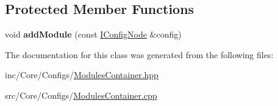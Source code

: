 \subsection*{Protected Member Functions}
\begin{DoxyCompactItemize}
\item 
\mbox{\label{classcore_1_1config_1_1ModulesContainer_ab6ada155227703fdd81f22c2047ffdc2}} 
void {\bfseries add\+Module} (const \hyperlink{classIConfigNode}{I\+Config\+Node} \&config)
\end{DoxyCompactItemize}


The documentation for this class was generated from the following files\+:\begin{DoxyCompactItemize}
\item 
inc/\+Core/\+Configs/\hyperlink{ModulesContainer_8hpp}{Modules\+Container.\+hpp}\item 
src/\+Core/\+Configs/\hyperlink{ModulesContainer_8cpp}{Modules\+Container.\+cpp}\end{DoxyCompactItemize}
